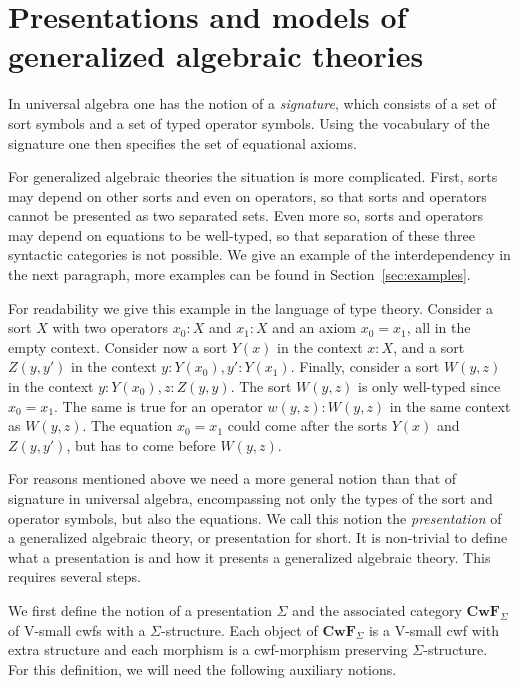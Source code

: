\documentclass{mscs}
\newcommand{\FYI}[1]{{#1}}
\def\V{\mathrm{V}}
\def\Cwf{\mathbf{CwF}}
\begin{document}
\section{Presentations and models of generalized algebraic theories}\label{gat-sig-mod}

In universal algebra one has the notion of a \emph{signature},
which consists of a set of sort symbols and a set of typed operator symbols.
Using the vocabulary of the signature one then specifies the set
of equational axioms. 

For generalized algebraic theories the situation is more complicated.
First, sorts may depend on other sorts and even on operators,
so that sorts and operators cannot be presented as two separated sets.
Even more so, sorts and operators may depend on equations to
be well-typed, so that separation of these three syntactic
categories is not possible. We give an example of the interdependency 
in the next paragraph, more examples can be found in Section~\ref{sec:examples}.

For readability we give this example in the language of type theory.
Consider a sort $X$ with two operators $x_0 :X$ and $x_1 : X$
and an axiom $x_0 = x_1$, all in the empty context. Consider now a sort
$Y(x)$ in the context $x:X$, and a sort $Z(y,y')$ in the context
$y:Y(x_0), y':Y(x_1)$. Finally, consider a sort $W(y,z)$ in the
context $y:Y(x_0), z:Z(y,y)$. The sort $W(y,z)$ is only well-typed
since $x_0 = x_1$. The same is true for an operator $w(y,z): W(y,z)$
in the same context as $W(y,z)$. The equation $x_0 = x_1$ could come
after the sorts $Y(x)$ and $Z(y,y')$, but has to come before $W(y,z)$.

For reasons mentioned above we need a more general notion
than that of signature in universal algebra, encompassing not only the types of the sort and operator symbols, but also the equations.  
We call this notion the \emph{presentation} of a generalized algebraic theory,
or presentation for short. It is non-trivial to define what a presentation
is and how it presents a generalized algebraic theory.
This requires several steps.

We first define the notion of a \FYI{presentation} $\Sigma$ and the associated category $\Cwf_{\Sigma}$ of $\V$-small cwfs with a $\Sigma$-structure.
Each object of $\Cwf_{\Sigma}$ is a $\V$-small cwf with extra structure and
each morphism is a cwf-morphism preserving $\Sigma$-structure.
For this definition, we will need the following auxiliary notions.
\end{document}
